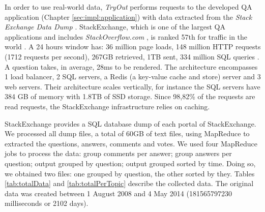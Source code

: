 In order to use real-world data, \emph{TryOut} performs requests to the developed \ac{QA} application (Chapter \ref{sec:impl:application}) with data extracted from the \textit{Stack Exchange Data Dump} \cite{stackexchange_data}. StackExchange, which is one of the largest \ac{QA} applications and includes \textit{StackOverflow.com} \cite{stackoverflow}, is ranked 57th for traffic in the world \cite{websiteRanking}. A 24 hours window has: 36 million page loads, 148 million \ac{HTTP} requests (1712 requests per second), 267GB retrieved, 1TB sent, 334 million \ac{SQL} queries \cite{stackStatistics}. A question takes, in average, 28ms to be rendered. The architecture encompasses 1 load balancer, 2 \ac{SQL} servers, a Redis \cite{redis} (a key-value cache and store) server and 3 web servers. Their architecture scales vertically, for instance the \ac{SQL} servers have 384 GB of memory with 1.8TB of SSD storage. Since 98,82\% of the requests are read requests, the StackExchange infrastructure relies on caching.

StackExchange provides a \ac{SQL} database dump of each portal of StackExchange. We processed all dump files, a total of 60GB of text files, using MapReduce \cite{mapreduce} to extracted the questions, answers, comments and votes. We used four MapReduce jobs to process the data: group comments per answer; group answers per question; output grouped by question; output grouped sorted by time. Doing so, we obtained two files: one grouped by question, the other sorted by they. Tables \ref{tab:totalData} and \ref{tab:totalPerTopic} describe the collected data. The original data was created between 1 August 2008 and 4 May 2014 (181565797230 milliseconds or 2102 days). 

